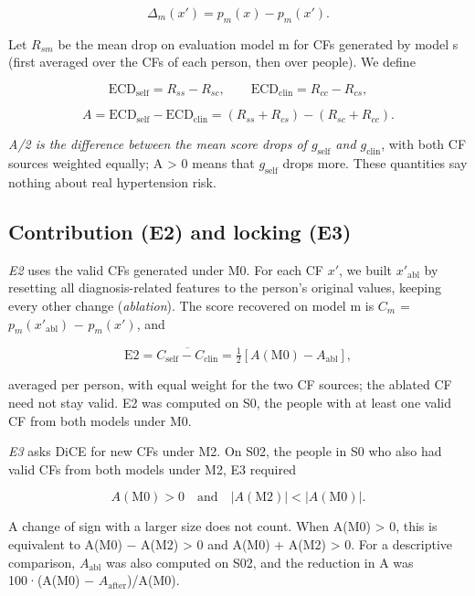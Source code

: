 \documentclass[preprint,review,12pt,times]{elsarticle}
\begin{document}
\[\Delta_m(x') = p_m(x) - p_m(x').\]

Let \(R_{sm}\) be the mean drop on evaluation model m for CFs generated
by model s (first averaged over the CFs of each person, then over
people). We define

\[\mathrm{ECD}_{\mathrm{self}} = R_{ss} - R_{sc}, \qquad \mathrm{ECD}_{\mathrm{clin}} = R_{cc} - R_{cs},\]

\[A = \mathrm{ECD}_{\mathrm{self}} - \mathrm{ECD}_{\mathrm{clin}} = (R_{ss}+R_{cs}) - (R_{sc}+R_{cc}).\]

\emph{A/2 is the difference between the mean score drops of
\(g_{\mathrm{self}}\) and \(g_{\mathrm{clin}}\)}, with both CF sources
weighted equally; A \textgreater{} 0 means that \(g_{\mathrm{self}}\)
drops more. These quantities say nothing about real hypertension risk.

\subsection{Contribution (E2) and locking (E3)}

\emph{E2} uses the valid CFs generated under M0. For each CF \(x'\), we
built \(x'_{\mathrm{abl}}\) by resetting all diagnosis-related features
to the person's original values, keeping every other change
(\emph{ablation}). The score recovered on model m is \(C_m\) =
\(p_m(x'_{\mathrm{abl}})\) − \(p_m(x')\), and

\[\mathrm{E2} = \overline{C_{\mathrm{self}} - C_{\mathrm{clin}}} = \tfrac{1}{2}\left[A(\mathrm{M0}) - A_{\mathrm{abl}}\right],\]

averaged per person, with equal weight for the two CF sources; the
ablated CF need not stay valid. E2 was computed on S0, the people with
at least one valid CF from both models under M0.

\emph{E3} asks DiCE for new CFs under M2. On S02, the people in S0 who
also had valid CFs from both models under M2, E3 required

\[A(\mathrm{M0}) > 0 \quad \text{and} \quad |A(\mathrm{M2})| < |A(\mathrm{M0})|.\]

A change of sign with a larger size does not count. When A(M0)
\textgreater{} 0, this is equivalent to A(M0) − A(M2) \textgreater{} 0
and A(M0) + A(M2) \textgreater{} 0. For a descriptive comparison,
\(A_{\mathrm{abl}}\) was also computed on S02, and the reduction in
\textbar A\textbar{} was 100·(\textbar A(M0)\textbar{} −
\textbar{}\(A_{\mathrm{after}}\)\textbar)/\textbar A(M0)\textbar.
\end{document}
